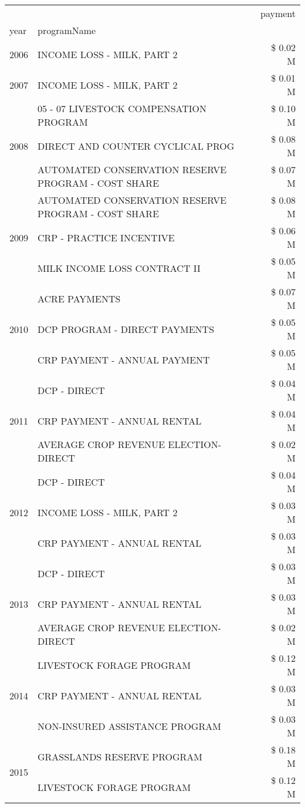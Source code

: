 \begin{tabular}{llr}
\toprule
 &  & payment \\
year & programName &  \\
\midrule
2006 & INCOME LOSS - MILK, PART 2 & \$ 0.02 M \\
\cline{1-3}
2007 & INCOME LOSS - MILK, PART 2 & \$ 0.01 M \\
\cline{1-3}
\multirow[t]{3}{*}{2008} & 05 - 07 LIVESTOCK COMPENSATION PROGRAM & \$ 0.10 M \\
 & DIRECT AND COUNTER CYCLICAL PROG & \$ 0.08 M \\
 & AUTOMATED CONSERVATION RESERVE PROGRAM - COST SHARE & \$ 0.07 M \\
\cline{1-3}
\multirow[t]{3}{*}{2009} & AUTOMATED CONSERVATION RESERVE PROGRAM - COST SHARE & \$ 0.08 M \\
 & CRP - PRACTICE INCENTIVE & \$ 0.06 M \\
 & MILK INCOME LOSS CONTRACT II & \$ 0.05 M \\
\cline{1-3}
\multirow[t]{3}{*}{2010} & ACRE PAYMENTS & \$ 0.07 M \\
 & DCP PROGRAM - DIRECT PAYMENTS & \$ 0.05 M \\
 & CRP PAYMENT - ANNUAL PAYMENT & \$ 0.05 M \\
\cline{1-3}
\multirow[t]{3}{*}{2011} & DCP - DIRECT & \$ 0.04 M \\
 & CRP PAYMENT - ANNUAL RENTAL & \$ 0.04 M \\
 & AVERAGE CROP REVENUE ELECTION-DIRECT & \$ 0.02 M \\
\cline{1-3}
\multirow[t]{3}{*}{2012} & DCP - DIRECT & \$ 0.04 M \\
 & INCOME LOSS - MILK, PART 2 & \$ 0.03 M \\
 & CRP PAYMENT - ANNUAL RENTAL & \$ 0.03 M \\
\cline{1-3}
\multirow[t]{3}{*}{2013} & DCP - DIRECT & \$ 0.03 M \\
 & CRP PAYMENT - ANNUAL RENTAL & \$ 0.03 M \\
 & AVERAGE CROP REVENUE ELECTION-DIRECT & \$ 0.02 M \\
\cline{1-3}
\multirow[t]{3}{*}{2014} & LIVESTOCK FORAGE PROGRAM & \$ 0.12 M \\
 & CRP PAYMENT - ANNUAL RENTAL & \$ 0.03 M \\
 & NON-INSURED ASSISTANCE PROGRAM & \$ 0.03 M \\
\cline{1-3}
\multirow[t]{3}{*}{2015} & GRASSLANDS RESERVE PROGRAM & \$ 0.18 M \\
 & LIVESTOCK FORAGE PROGRAM & \$ 0.12 M \\

\end{tabular}
